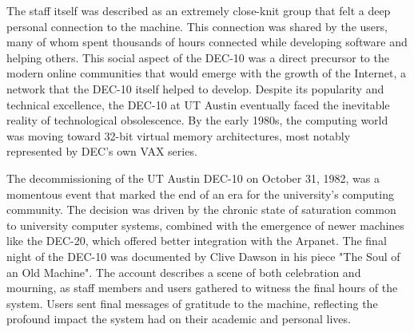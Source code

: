 The staff itself was described as an extremely close-knit group that felt a deep personal connection to the machine. This connection was shared by the users, many of whom spent thousands of hours connected while developing software and helping others. This social aspect of the DEC-10 was a direct precursor to the modern online communities that would emerge with the growth of the Internet, a network that the DEC-10 itself helped to develop. Despite its popularity and technical excellence, the DEC-10 at UT Austin eventually faced the inevitable reality of technological obsolescence. By the early 1980s, the computing world was moving toward 32-bit virtual memory architectures, most notably represented by DEC's own VAX series. 

The decommissioning of the UT Austin DEC-10 on October 31, 1982, was a momentous event that marked the end of an era for the university's computing community. The decision was driven by the chronic state of saturation common to university computer systems, combined with the emergence of newer machines like the DEC-20, which offered better integration with the Arpanet. The final night of the DEC-10 was documented by Clive Dawson in his piece "The Soul of an Old Machine". The account describes a scene of both celebration and mourning, as staff members and users gathered to witness the final hours of the system. Users sent final messages of gratitude to the machine, reflecting the profound impact the system had on their academic and personal lives.

